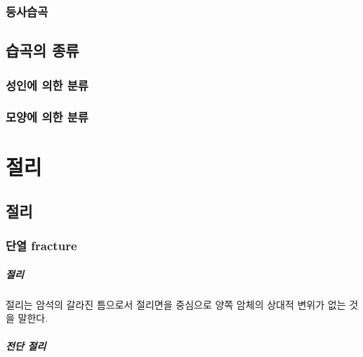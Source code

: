 \documentclass[12pt, a4paper, oneside]{book}
\begin{document}
	\subsection{등사습곡}
	
	
	





	\clearpage
	\section{습곡의 종류}



	\subsection{성인에 의한 분류}

	\subsection{모양에 의한 분류}


	
	\clearpage
	\chapter{절리}



	\clearpage
	\section{절리}

	\subsection{단열 fracture}


	\paragraph{절리}
	절리는 암석의 갈라진 틈으로서 절리면을 중심으로 양쪽 암체의 상대적 변위가 없는 것을 말한다.
	
	\paragraph{전단 절리}
	
\end{document}
